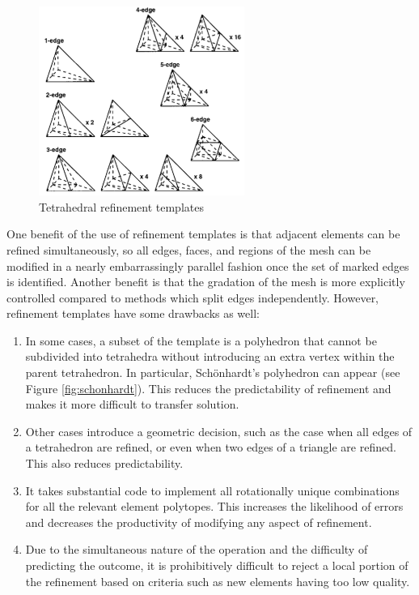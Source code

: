 \begin{figure}
\begin{center}
\includegraphics[width=0.6\textwidth]{tet_templates.png}
\caption{Tetrahedral refinement templates}
\label{fig:tet_templates}
\end{center}
\end{figure}

One benefit of the use of refinement templates is that adjacent elements can be refined
simultaneously, so all edges, faces, and regions of the mesh can be modified in
a nearly embarrassingly parallel fashion once the set of marked edges is identified.
Another benefit is that the gradation of the mesh is more explicitly controlled
compared to methods which split edges independently.
However, refinement templates have some drawbacks as well:
\begin{enumerate}
\item In some cases, a subset of the template is a polyhedron that cannot be
subdivided into tetrahedra without introducing an extra vertex within the
parent tetrahedron.
In particular, Sch{\"o}nhardt's polyhedron can appear (see Figure
\ref{fig:schonhardt}).
This reduces the predictability of refinement and makes it more difficult
to transfer solution.
\item Other cases introduce a geometric decision, such as the case
when all edges of a tetrahedron are refined, or even when two edges
of a triangle are refined. This also reduces predictability.
\item It takes substantial code to implement all rotationally unique
combinations for all the relevant element polytopes.
This increases the likelihood of errors and decreases the productivity
of modifying any aspect of refinement.
\item Due to the simultaneous nature of the operation and the difficulty
of predicting the outcome, it is prohibitively difficult to reject
a local portion of the refinement based on criteria such as new elements
having too low quality.
\end{enumerate}

